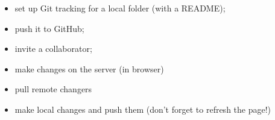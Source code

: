 \documentclass[a4paper,11pt]{article}
\begin{document}
\begin{tcolorbox}[width=\textwidth, colback={yellow!40!white}, title={}, colbacktitle=yellow!60!white, coltitle=black]
	\begin{itemize}
		\item set up Git tracking for a local folder (with a README);
		\item push it to GitHub;  
		\item invite a collaborator;
		\item make changes on the server (in browser)
		\item pull remote changers
		\item make local changes and push them (don't forget to refresh the page!)
	\end{itemize}
	
\end{tcolorbox}%
\end{document}
